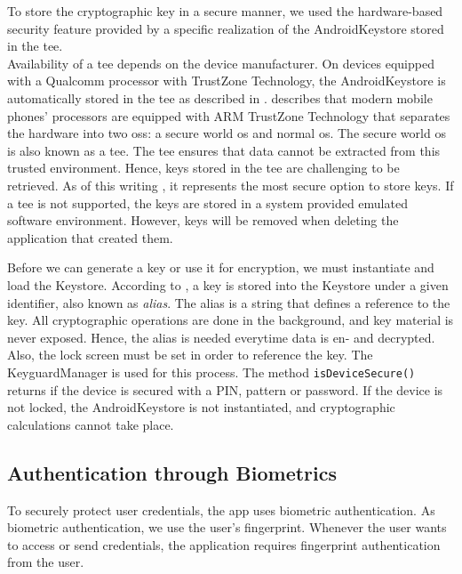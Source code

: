 To store the cryptographic key in a secure manner, we used the hardware-based security feature provided by a specific realization of the AndroidKeystore stored in the \gls{tee}. \\
Availability of a \gls{tee} depends on the device manufacturer. On devices equipped with a Qualcomm processor with TrustZone Technology, the AndroidKeystore is automatically stored in the \gls{tee} as described in \cite{CooijmansRP14}. \cite{CooijmansRP14} describes that modern mobile phones' processors are equipped with ARM TrustZone Technology that separates the hardware into two \glspl{os}: a secure world \gls{os} and normal \gls{os}. The secure world \gls{os} is also known as a \gls{tee}.  The \gls{tee} ensures that data cannot be extracted from this trusted environment. Hence, keys stored in the \gls{tee} are challenging to be retrieved. As of this writing \cite{SecureDataEncryption}, it represents the most secure option to store keys. If a \gls{tee} is not supported, the keys are stored in a system provided emulated software environment. However, keys will be removed when deleting the application that created them.

Before we can generate a key or use it for encryption, we must instantiate and load the Keystore. According to \cite{CooijmansRP14}, a key is stored into the Keystore under a given identifier, also known as \textit{alias}. The alias is a string that defines a reference to the key. All cryptographic operations are done in the background, and key material is never exposed. Hence, the alias is needed everytime data is en- and decrypted. \\
Also, the lock screen must be set in order to reference the key. The KeyguardManager is used for this process. The method \texttt{isDeviceSecure()} returns if the device is secured with a PIN, pattern or password. If the device is not locked, the AndroidKeystore is not instantiated, and cryptographic calculations cannot take place. \\




\subsection{Authentication through Biometrics} \label{arch_authenticate}
To securely protect user credentials, the app uses biometric authentication. As biometric authentication, we use the user's fingerprint. Whenever the user wants to access or send credentials, the application requires fingerprint authentication from the user.

